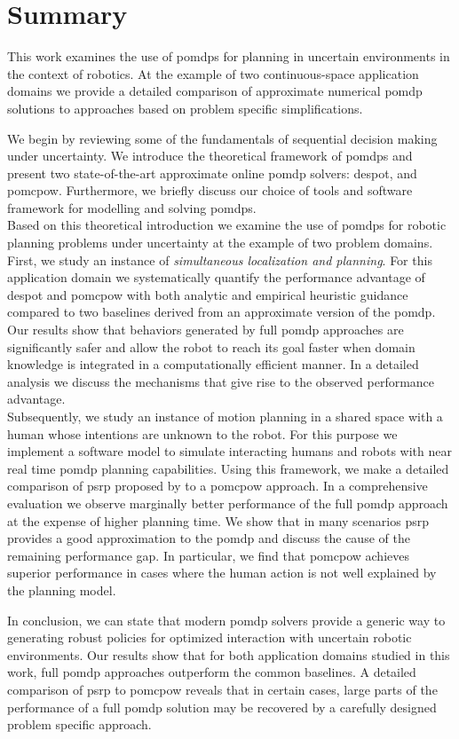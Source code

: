 \chapter{Summary}\label{chap:summary}

This work examines the use of \acfp{pomdp} for planning in uncertain
environments in the context of robotics. At the example of two continuous-space
application domains we provide a detailed comparison of approximate numerical
\ac{pomdp} solutions to approaches based on problem specific simplifications.

We begin by reviewing some of the fundamentals of sequential decision making
under uncertainty. We introduce the theoretical framework of \acp{pomdp} and
present two state-of-the-art approximate online \ac{pomdp} solvers:
\acf{despot}, and \acf{pomcpow}. Furthermore, we briefly discuss our choice of
tools and software framework for modelling and solving
\acp{pomdp}.\\
Based on this theoretical introduction we examine the use of \acp{pomdp} for
robotic planning problems under uncertainty at the example of two problem
domains.\\
First, we study an instance of \emph{simultaneous localization and planning}.
For this application domain we systematically quantify the performance
advantage of \ac{despot} and \ac{pomcpow} with both analytic and empirical
heuristic guidance compared to two baselines derived from an approximate
version of the \ac{pomdp}. Our results show that behaviors generated by full
\ac{pomdp} approaches are significantly safer and allow the robot to reach its
goal faster when domain knowledge is integrated in a computationally efficient
manner. In a detailed analysis we discuss the mechanisms that give rise to the
observed performance advantage.\\
Subsequently, we study an instance of motion planning in a shared space with
a human whose intentions are unknown to the robot. For this purpose we
implement a software model to simulate interacting humans and robots with near
real time \ac{pomdp} planning capabilities. Using this framework, we make
a detailed comparison of \acf{psrp} proposed by
\cite{fisac2018probabilistically} to a \ac{pomcpow} approach. In
a comprehensive evaluation we observe marginally better performance of the full
\ac{pomdp} approach at the expense of higher planning time. We show that in
many scenarios \ac{psrp} provides a good approximation to the \ac{pomdp} and
discuss the cause of the remaining performance gap. In particular, we find that
\ac{pomcpow} achieves superior performance in cases where the human action is
not well explained by the planning model.

In conclusion, we can state that modern \ac{pomdp} solvers provide a generic
way to generating robust policies for optimized interaction with uncertain
robotic environments. Our results show that for both application domains
studied in this work, full \ac{pomdp} approaches outperform the common
baselines. A detailed comparison of \ac{psrp} to \ac{pomcpow} reveals that in
certain cases, large parts of the performance of a full \ac{pomdp} solution may
be recovered by a carefully designed problem specific approach.

